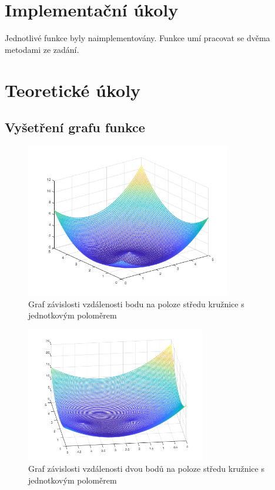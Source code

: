 
\section{Implementační úkoly}

Jednotlivé funkce byly naimplementovány. Funkce  umí pracovat se dvěma metodami ze zadání.

\section{Teoretické úkoly}

\subsection{Vyšetření grafu funkce}

\begin{figure}[H]
    \centering
    \includegraphics[width=0.8\textwidth]{../1point.png}
    \caption{Graf závislosti vzdálenosti bodu na poloze středu kružnice s jednotkovým poloměrem}
\end{figure}

\begin{figure}[H]
    \centering
    \includegraphics[width=0.7\textwidth]{../2points.png}
    \caption{Graf závislosti vzdálenosti dvou bodů na poloze středu kružnice s jednotkovým poloměrem}
\end{figure}

